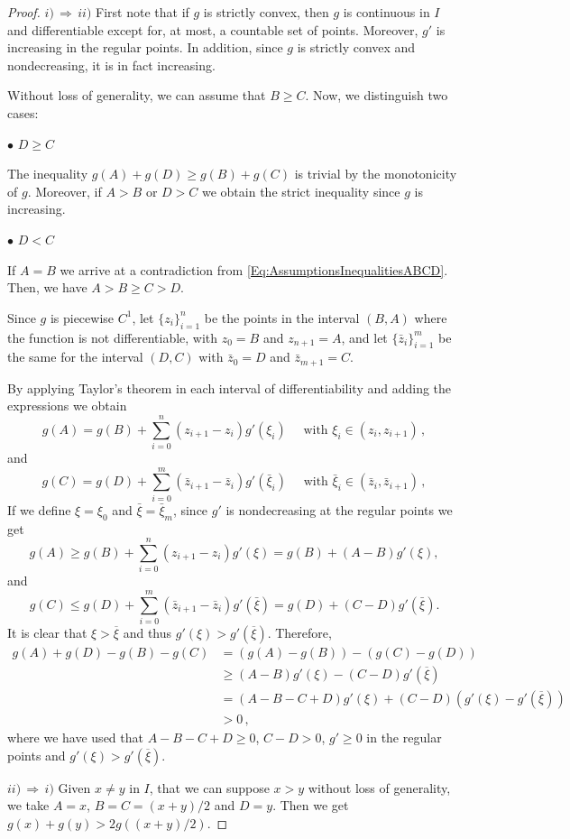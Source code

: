 \begin{proof}
$i)\, \Rightarrow \,ii)$ First note that if $g$ is strictly convex, then $g$ is continuous in $I$ and differentiable except for, at most, a countable set of points. Moreover, $g'$ is increasing in the regular points. In addition, since $g$ is strictly convex and nondecreasing, it is in fact increasing.

Without loss of generality, we can assume that $B \geq C$. Now, we distinguish two cases:


$\bullet$ $D \geq C$

The inequality $g(A) + g(D) \geq g(B) + g(C)$ is trivial by the monotonicity of $g$. Moreover, if $A>B$ or $D>C$ we obtain the strict inequality since $g$ is increasing.

$\bullet$ $D < C$

If $A = B$ we arrive at a contradiction from \eqref{Eq:AssumptionsInequalitiesABCD}. Then, we have
$A > B \geq C > D$.

Since $g$ is piecewise $C^1$, let $\{z_i\}_{i=1}^{n}$ be the points in the interval $(B,A)$ where
the function is not differentiable, with $z_0 = B$ and $z_{n+1}=A$, and let
$\{\bar{z}_i\}_{i=1}^{m}$ be the same for the interval $(D,C)$ with $\bar{z}_0 = D$ and
$\bar{z}_{m+1}=C$.

By applying Taylor's theorem in each interval of differentiability and adding the expressions we
obtain
$$
g(A) = g(B) + \sum_{i=0}^{n}(z_{i+1}-z_i) g'(\xi_i) \quad \textrm{ with } \xi_i \in (z_i,z_{i+1})\,,
$$
and
$$
g(C) = g(D) + \sum_{i=0}^{m}(\bar{z}_{i+1}-\bar{z}_i) g'(\bar{\xi}_i) \quad \textrm{ with } \bar{\xi}_i \in (\bar{z}_i,\bar{z}_{i+1})\,,
$$
If we define $\xi = \xi_0 $ and $\bar{\xi} = \bar{\xi}_m$, since $g'$ is nondecreasing at the regular points we get
$$
g(A) \geq g(B) + \sum_{i=0}^{n}(z_{i+1}-z_i) g'(\xi) = g(B) + (A-B)g'(\xi),
$$
and
$$
g(C) \leq g(D) + \sum_{i=0}^{m}(\bar{z}_{i+1}-\bar{z}_i) g'(\bar{\xi}) = g(D)+(C-D)g'(\bar{\xi}) .
$$
It is clear that $\xi > \overline{\xi}$ and thus $g'(\xi) > g'(\overline{\xi})$. Therefore,
\begin{align*}
g(A) + g(D) - g(B) - g(C) &= (g(A) - g(B)) - (g(C) - g(D)) \\
&\geq (A - B)g'(\xi)  - (C - D)g'(\overline{\xi}) \\
&= (A - B - C + D)g'(\xi) + (C - D) (g'(\xi) - g'(\overline{\xi}))\\
& > 0\,,
\end{align*}
where we have used that $A - B - C + D \geq 0$, $C - D > 0$, $g'\geq 0$ in the regular points and
$g'(\xi) > g'(\overline{\xi})$.

$ii)\, \Rightarrow \,i)$ Given $x\neq y$ in $I$, that we can suppose $x>y$ without loss of generality, we take $A=x$, $B=C=(x+y)/2$ and $D=y$. Then we get $ g(x)+g(y) > 2g\left( (x+y)/2 \right)$.
\end{proof}

